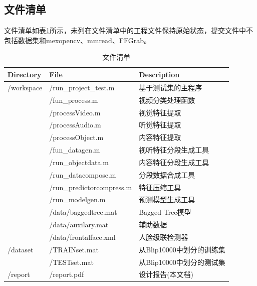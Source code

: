 \documentclass{article}
\begin{document}
\begin{multicols}{2}
    \section{文件清单}
        文件清单如表\ref{tabel:filelist}所示，未列在文件清单中的工程文件保持原始状态，提交文件中不包括数据集和mexopencv、mmread、FFGrab。
        \begin{table}[htb]
          \centering
          \begin{tabular}{lll}
            \toprule
            \textbf{Directory} & \textbf{File} & \textbf{Description} \\
            \midrule
            /workspace  & /run\_project\_test.m & 基于测试集的主程序 \\
                        & /fun\_process.m & 视频分类处理函数 \\
                        & /processVideo.m & 视觉特征提取 \\
                        & /processAudio.m & 听觉特征提取 \\
                        & /processObject.m & 内容特征提取 \\
                        & /fun\_datagen.m & 视听特征分段生成工具 \\
                        & /run\_objectdata.m & 内容特征分段生成工具 \\
                        & /run\_datacompose.m & 分段数据合成工具 \\
                        & /run\_predictorcompress.m & 特征压缩工具 \\
                        & /run\_modelgen.m & 预测模型生成工具 \\
                        & /data/baggedtree.mat & Bagged Tree模型 \\
                        & /data/auxilary.mat & 辅助数据 \\
                        & /data/frontalface.xml & 人脸级联检测器 \\
            \midrule
            /dataset    & /TRAINset.mat & 从Blip10000中划分的训练集 \\
                        & /TESTset.mat & 从Blip10000中划分的测试集 \\
            \midrule
            /report     & /report.pdf & 设计报告(本文档) \\
            \bottomrule
          \end{tabular}
          \caption{文件清单}
          \label{tabel:filelist}
        \end{table}


\end{multicols}
\end{document}

